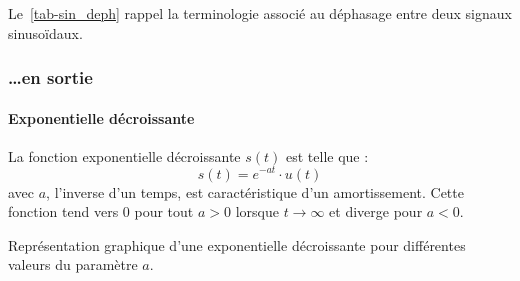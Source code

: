 Le~\cref{tab-sin_deph} rappel la terminologie associé au déphasage entre 
deux signaux sinuso\"idaux. 
\subsubsection{\ldots en sortie}
\paragraph{Exponentielle décroissante}
La fonction exponentielle décroissante $s(t)$ est telle que :
\[
    s(t)=e^{-at}\cdot u(t)
\]
avec $a$, l'inverse d'un temps, est caractéristique d'un amortissement.
Cette fonction tend vers 0 pour tout $a>0$ lorsque $t\rightarrow\infty$ et 
diverge pour $a<0$.
\begin{marginfigure}[-9em]
    \captionsetup{width=0.95\linewidth,belowskip=0pt,labelfont=bf} 
    \centering
    \resizebox{\linewidth}{!}{}
    \caption{Représentation graphique d'une exponentielle décroissante pour 
             différentes valeurs du paramètre $a$.\label{fig-exp}}
\end{marginfigure}
